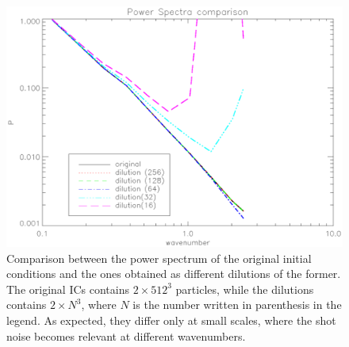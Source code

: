 \documentclass[11pt,a4paper,titlepage]{article}
\newcommand{\ie}{\emph{i.e.}\xspace}
\begin{document}
\begin{figure}[!tbp]
\centering
\includegraphics[width=\textwidth]{PowerSpectra_comparison.eps}
\caption{Comparison between the power spectrum of the original initial conditions and the ones obtained as different dilutions of the former. The original ICs contains $2 \times 512^3$ particles, while the dilutions contains $2 \times N^3$, where $N$ is the number written in parenthesis in the legend. As expected, they differ only at small scales, where the shot noise becomes relevant at different wavenumbers.}
\label{PowSp_compare}
\end{figure}

\end{document}
